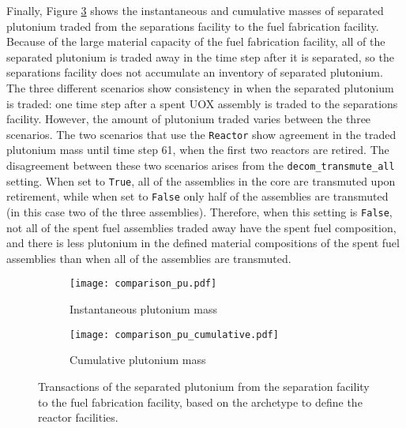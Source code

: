 Finally, Figure \ref{fig:comparison_pu} shows the instantaneous and cumulative 
masses of separated plutonium traded from the separations facility to 
the fuel fabrication facility. Because of the large material capacity of 
the fuel fabrication facility, all of the separated plutonium is traded 
away in the time step after it is separated, so the separations facility does 
not accumulate an inventory of separated plutonium. The three different 
scenarios show consistency
in when the separated plutonium is traded: one time step after a spent
\gls{UOX} assembly is traded to the separations facility. However, the 
amount of plutonium traded varies between the three scenarios. The two 
scenarios that use the \Cycamore \texttt{Reactor} show agreement in the 
traded plutonium mass until time step 61, when the first two reactors are
retired. The disagreement between these two scenarios arises from the 
\texttt{decom\_transmute\_all} setting. When set to \texttt{True}, 
all of the assemblies in the core are transmuted upon retirement, 
while when set to \texttt{False} only half of the assemblies are 
transmuted (in this case two of the three assemblies). Therefore, 
when this setting is \texttt{False}, not all of the 
spent fuel assemblies traded away have the spent fuel composition, and 
there is less plutonium in the defined material compositions 
of the spent fuel assemblies than when all of the assemblies are transmuted. 

\begin{figure}[ht!]
    \centering
    \begin{subfigure}[b]{0.48\textwidth}
        \centering
        \texttt{[image: comparison\_pu.pdf]}
        \caption{Instantaneous plutonium mass}
        \label{fig:comparison_pu_inst}
    \end{subfigure}
    \hfill
    \begin{subfigure}[b]{0.48\textwidth}
        \centering
        \texttt{[image: comparison\_pu\_cumulative.pdf]}
        \caption{Cumulative plutonium mass}
        \label{fig:comparison_pu_cumulative}
    \end{subfigure}
       \caption{Transactions of the separated plutonium from the
       separation facility to the fuel fabrication facility, based 
       on the archetype to define the reactor facilities.}
       \label{fig:comparison_pu}
\end{figure}

